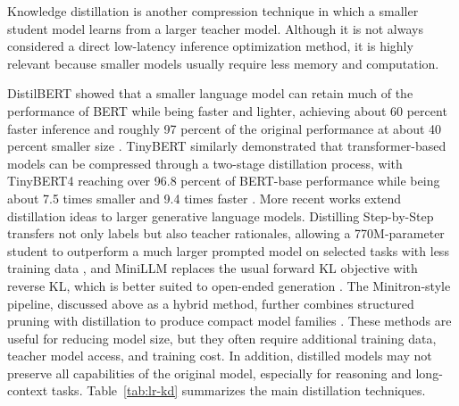 Knowledge distillation is another compression technique in which a smaller student model learns from a larger teacher model. Although it is not always considered a direct low-latency inference optimization method, it is highly relevant because smaller models usually require less memory and computation.

DistilBERT showed that a smaller language model can retain much of the performance of BERT while being faster and lighter, achieving about 60 percent faster inference and roughly 97 percent of the original performance at about 40 percent smaller size \cite{sanh2020distilbert}. TinyBERT similarly demonstrated that transformer-based models can be compressed through a two-stage distillation process, with TinyBERT4 reaching over 96.8 percent of BERT-base performance while being about 7.5 times smaller and 9.4 times faster \cite{jiao2020tinybert}. More recent works extend distillation ideas to larger generative language models. Distilling Step-by-Step transfers not only labels but also teacher rationales, allowing a 770M-parameter student to outperform a much larger prompted model on selected tasks with less training data \cite{hsieh2023distilling}, and MiniLLM replaces the usual forward KL objective with reverse KL, which is better suited to open-ended generation \cite{gu2024minillm}. The Minitron-style pipeline, discussed above as a hybrid method, further combines structured pruning with distillation to produce compact model families \cite{muralidharan2024minitron}. These methods are useful for reducing model size, but they often require additional training data, teacher model access, and training cost. In addition, distilled models may not preserve all capabilities of the original model, especially for reasoning and long-context tasks. Table~\ref{tab:lr-kd} summarizes the main distillation techniques.

